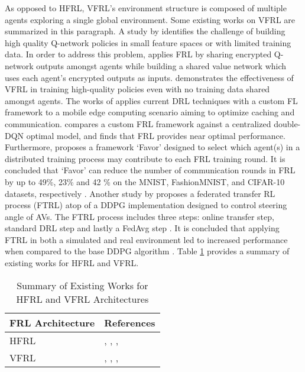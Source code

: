 As opposed to HFRL, VFRL's environment structure is composed of multiple agents exploring
a single global environment. Some existing works on VFRL are summarized in this paragraph.
A study by \cite{Zhuo2019} identifies the challenge of building high quality Q-network policies in
small feature spaces or with limited training data.  In order to address this problem, \cite{Zhuo2019} applies FRL
by sharing encrypted Q-network outputs amongst agents while building a
shared value network which uses each agent's encrypted outputs as inputs.
\cite{Zhuo2019} demonstrates the effectiveness of VFRL in training high-quality policies
even with no training data shared amongst agents.
The works of \cite{Wang2018a} applies current DRL techniques with a custom FL framework to a mobile edge computing scenario
aiming to optimize caching and communication. \cite{Wang2018a} compares a custom FRL
framework against a centralized double-DQN optimal model, and finds
that FRL provides near optimal performance.  Furthermore, \cite{Wang2020a} proposes a framework
`Favor' designed to select which agent(s) in a distributed
training process may contribute to each FRL training round. It is concluded that `Favor' can reduce
the number of communication rounds in FRL by up to 49\%, 23\% and 42 \% on the MNIST, FashionMNIST, and CIFAR-10
datasets, respectively \cite{Wang2020a}. Another study by \cite{Liang2019} proposes a federated transfer
RL process (FTRL) atop of a DDPG implementation designed to control steering angle of AVs.
The FTRL process includes three steps: online
transfer step, standard DRL step and lastly a FedAvg step \cite{Liang2019}.
It is concluded that applying FTRL in both a simulated and real environment led to increased
performance when compared to the base DDPG algorithm \cite{Liang2019}.  Table \ref{tab:HFRLVFRLworks} provides a summary of existing
works for HFRL and VFRL.


\begin{table}[H]
  \centering
  \caption{Summary of Existing Works for HFRL and VFRL Architectures}
    \begin{tabular}{ll} \toprule
    \textbf{FRL Architecture} & \textbf{References} \\ \midrule
    \midrule
    HFRL & \cite{Lim2020}, \cite{Nadiger2019}, \cite{Liu2019b}, \cite{Ren2019} \\
    VFRL & \cite{Zhuo2019}, \cite{Wang2018a}, \cite{Wang2020a}, \cite{Liang2019} \\ \bottomrule
    \end{tabular}%
  \label{tab:HFRLVFRLworks}%
\end{table}%

